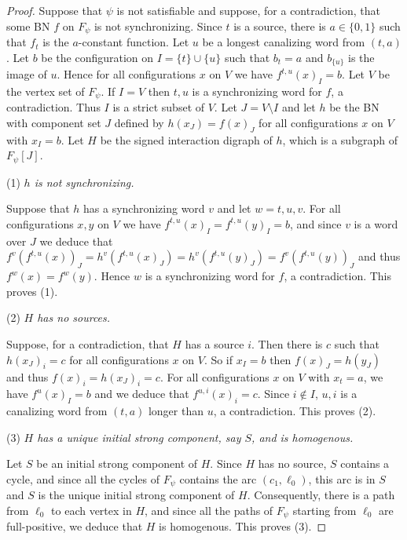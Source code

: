 \documentclass[11pt,letter]{article}
\newcommand{\BF}[1]{{{\boldmath{\bf #1}\unboldmath}}}
\newcommand{\B}{\{0,1\}}
\begin{document}
\begin{proof}
\BF{($1 \Rightarrow 2$)} Suppose that $\psi$ is not satisfiable and suppose, for a contradiction, that some BN $f$ on $F_\psi$ is not synchronizing. Since $t$ is a source, there is $a\in\B$ such that $f_t$ is the $a$-constant function. Let $u$ be a longest canalizing word from $(t,a)$. Let $b$ be the configuration on $I=\{t\}\cup\{u\}$ such that $b_t=a$ and $b_{\{u\}}$ is the image of $u$. Hence for all configurations $x$ on $V$ we have $f^{t,u}(x)_I=b$. Let $V$ be the vertex set of $F_\psi$. If $I=V$ then $t,u$ is a synchronizing word for $f$, a contradiction. Thus $I$ is a strict subset of $V$. Let $J=V\setminus I$ and let $h$ be the BN with component set $J$ defined by $h(x_J)=f(x)_J$ for all configurations $x$ on $V$ with $x_I=b$. Let $H$ be the signed interaction digraph of $h$, which is a subgraph of $F_\psi[J]$. 

\bigskip
\noindent
(1) {\em $h$ is not synchronizing.}

\medskip
\noindent
Suppose that $h$ has a synchronizing word $v$ and let $w=t,u,v$. For all configurations $x,y$ on $V$ we have $f^{t,u}(x)_I=f^{t,u}(y)_I=b$, and since $v$ is a word over $J$ we deduce that $f^v(f^{t,u}(x))_J=h^v(f^{t,u}(x)_J)=h^v(f^{t,u}(y)_J)=f^v(f^{t,u}(y))_J$ and thus $f^w(x)=f^w(y)$. Hence $w$ is a synchronizing word for $f$, a contradiction. This proves (1). 

\bigskip
\noindent
(2) {\em $H$ has no sources.}

\medskip
\noindent
Suppose, for a contradiction, that $H$ has a source $i$. Then there is $c$ such that $h(x_J)_i=c$ for all configurations $x$ on $V$. So if $x_I=b$ then $f(x)_J=h(y_J)$ and thus $f(x)_i=h(x_J)_i=c$. For all configurations $x$ on $V$ with $x_t=a$, we have $f^u(x)_I=b$ and we deduce that $f^{u,i}(x)_i=c$. Since $i\not\in I$, $u,i$ is a canalizing word from $(t,a)$ longer than $u$, a contradiction. This proves (2). 

\bigskip
\noindent
(3) {\em $H$ has a unique initial strong component, say $S$, and is homogenous.}

\medskip
\noindent
Let $S$ be an initial strong component of $H$. Since $H$ has no source, $S$ contains a cycle, and since all the cycles of $F_\psi$ contains the arc $(c_1,\ell_0)$, this arc is in $S$ and $S$ is the unique initial strong component of $H$. Consequently, there is a path from $\ell_0$ to each vertex in $H$, and since all the paths of $F_\psi$ starting from $\ell_0$ are full-positive, we deduce that $H$ is homogenous. This proves (3).


\end{proof}
\end{document}
